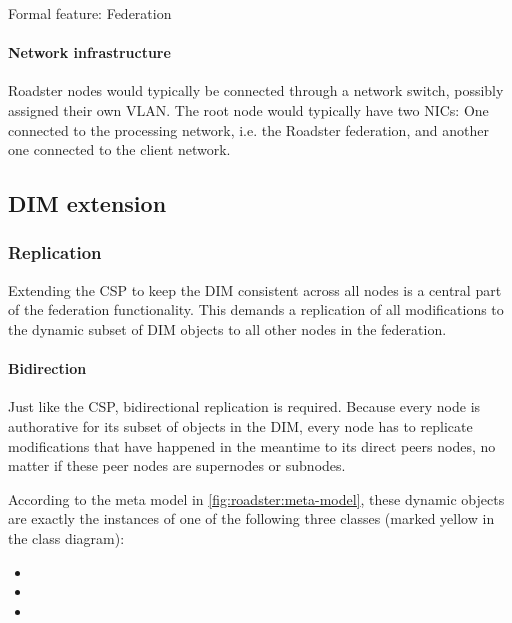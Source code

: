 \begin{listing}
	\inputminted{Gherkin}{listings/features/federation/federation.feature}
	\caption{Formal feature: Federation}
	\label{lst:feature:federation}
\end{listing}

\paragraph{Network infrastructure} Roadster nodes would typically be connected
through a network switch, possibly assigned their own \gls{VLAN}. The root node
would typically have two \glspl{NIC}: One connected to the processing network,
i.e. the Roadster federation, and another one connected to the client network.

\subsection{DIM extension}

\subsubsection{Replication}
Extending the \gls{CSP} to keep the \gls{DIM} consistent across all nodes is a central
part of the federation functionality. This demands a replication of all modifications to
the dynamic subset of DIM objects to all other nodes in the federation.

\paragraph{Bidirection} Just like the CSP, bidirectional replication is required.
Because every node is authorative for its subset of objects in the
DIM, every node has to replicate modifications that have happened in the
meantime to its direct peers nodes, no matter if these peer nodes are
supernodes or subnodes.

According to the meta model in \autoref{fig:roadster:meta-model}, these dynamic
objects are exactly the instances of one of the following three
classes (marked yellow in the class diagram):
\begin{itemize}
	\item {}
	\item {}
	\item {}
\end{itemize}

